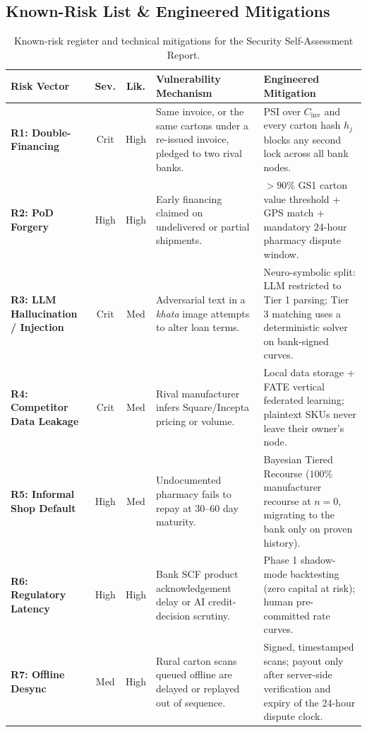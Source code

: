 \documentclass[10pt,a4paper]{article}
\begin{document}
\subsection{Known-Risk List \& Engineered Mitigations}
\begin{table}[h!]
\centering
\footnotesize
\begin{tabularx}{\textwidth}{L{2.6cm} c c L{4.0cm} Y}
\toprule
\textbf{Risk Vector} & \textbf{Sev.} & \textbf{Lik.} & \textbf{Vulnerability Mechanism} & \textbf{Engineered Mitigation} \\
\midrule
\textbf{R1: Double-Financing} & Crit & High & Same invoice, or the same cartons under a re-issued invoice, pledged to two rival banks. & PSI over $C_{\text{inv}}$ and every carton hash $h_j$ blocks any second lock across all bank nodes. \\
\addlinespace
\textbf{R2: PoD Forgery} & High & High & Early financing claimed on undelivered or partial shipments. & $>90\%$ GS1 carton value threshold + GPS match + mandatory 24-hour pharmacy dispute window. \\
\addlinespace
\textbf{R3: LLM Hallucination / Injection} & Crit & Med & Adversarial text in a \textit{khata} image attempts to alter loan terms. & Neuro-symbolic split: LLM restricted to Tier 1 parsing; Tier 3 matching uses a deterministic solver on bank-signed curves. \\
\addlinespace
\textbf{R4: Competitor Data Leakage} & Crit & Med & Rival manufacturer infers Square/Incepta pricing or volume. & Local data storage + FATE vertical federated learning; plaintext SKUs never leave their owner's node. \\
\addlinespace
\textbf{R5: Informal Shop Default} & High & Med & Undocumented pharmacy fails to repay at 30--60 day maturity. & Bayesian Tiered Recourse ($100\%$ manufacturer recourse at $n=0$, migrating to the bank only on proven history). \\
\addlinespace
\textbf{R6: Regulatory Latency} & High & High & Bank SCF product acknowledgement delay or AI credit-decision scrutiny. & Phase 1 shadow-mode backtesting (zero capital at risk); human pre-committed rate curves. \\
\addlinespace
\textbf{R7: Offline Desync} & Med & High & Rural carton scans queued offline are delayed or replayed out of sequence. & Signed, timestamped scans; payout only after server-side verification and expiry of the 24-hour dispute clock. \\
\bottomrule
\end{tabularx}
\caption{Known-risk register and technical mitigations for the Security Self-Assessment Report.}
\end{table}
\end{document}
